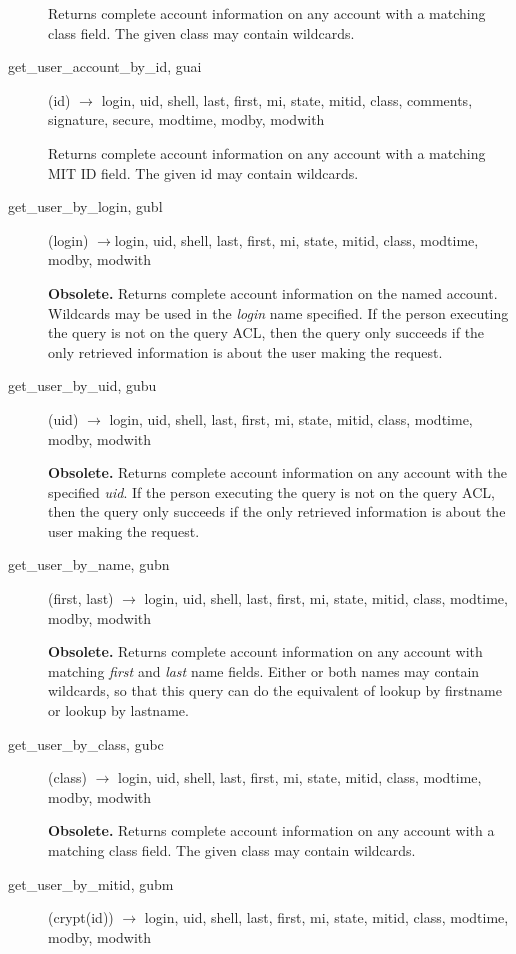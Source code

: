 \begin{description}
Returns complete account information on any account with a matching
class field.  The given class may contain wildcards.

\item[get\_user\_account\_by\_id, guai](id) $\rightarrow$ login, uid, shell, last, first,
mi, state, mitid, class, comments, signature, secure, modtime, modby, modwith

Returns complete account information on any account with a matching
MIT ID field.  The given id may contain wildcards.

\item[get\_user\_by\_login, gubl](login) $\rightarrow$login, uid, shell,
last, first, mi, state, mitid, class, modtime, modby, modwith

{\bf Obsolete.}  Returns complete account information on the named
account.  Wildcards may be used in the {\em login} name specified.  If
the person executing the query is not on the query ACL, then the query
only succeeds if the only retrieved information is about the user
making the request.

\item[get\_user\_by\_uid, gubu](uid) $\rightarrow$ login, uid, shell, last, first, mi,
state, mitid, class, modtime, modby, modwith

{\bf Obsolete.}  Returns complete account information on any account
with the specified {\em uid}.  If the person executing the query is not
on the query ACL, then the query only succeeds if the only retrieved
information is about the user making the request.

\item[get\_user\_by\_name, gubn](first, last) $\rightarrow$ login, uid, shell,
last, first, mi, state, mitid, class, modtime, modby, modwith

{\bf Obsolete.}  Returns complete account information on any account
with matching {\em first} and {\em last} name fields.  Either or both
names may contain wildcards, so that this query can do the equivalent
of lookup by firstname or lookup by lastname.

\item[get\_user\_by\_class, gubc](class) $\rightarrow$ login, uid, shell, last,
first, mi, state, mitid, class, modtime, modby, modwith

{\bf Obsolete.}  Returns complete account information on any account
with a matching class field.  The given class may contain wildcards.

\item[get\_user\_by\_mitid, gubm](crypt(id)) $\rightarrow$ login, uid, shell, last, first,
mi, state, mitid, class, modtime, modby, modwith


\end{description}
